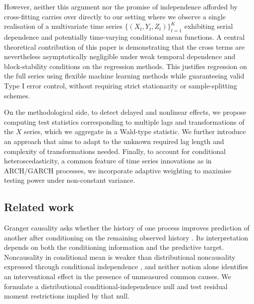 \documentclass[12pt]{article}
\numberwithin{equation}{section}
\begin{document}
However, neither this argument nor the promise of independence afforded by cross-fitting carries over directly to our setting where we observe a single realisation of a multivariate time series $\{(X_t,Y_t,Z_t)\}_{t=1}^K$ exhibiting serial dependence and potentially time-varying conditional mean functions. %
A central theoretical contribution of this paper is demonstrating that the %
cross terms are nevertheless asymptotically negligible under weak temporal dependence and block-stability conditions on the regression methods.
This justifies regression on the full series using flexible machine learning methods while guaranteeing valid Type I error control, without requiring strict stationarity or sample-splitting schemes.


On the methodological side, to detect delayed and nonlinear effects, we propose computing test statistics corresponding to multiple lags and transformations of the $X$ series, which we aggregate in a Wald-type statistic. We further introduce an approach that aims to adapt to the unknown required lag length and complexity of transformations needed.
Finally, to account for conditional heteroscedasticity, a common feature of time series innovations as in ARCH/GARCH processes, we incorporate adaptive weighting to maximise testing power under non-constant variance.


\subsection{Related work}

Granger causality asks whether the history of one process improves prediction of another after conditioning on the remaining observed history \citep{granger1969investigating,granger1980testing}. Its interpretation depends on both the conditioning information and the predictive target. Noncausality in conditional mean is weaker than distributional noncausality expressed through conditional independence \citep{eichler2012graphical,shojaie2022granger}, and neither notion alone identifies an interventional effect in the presence of unmeasured common causes. We formulate a distributional conditional-independence null and test residual moment restrictions implied by that null.
\end{document}
